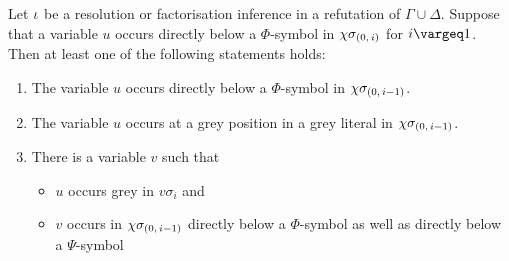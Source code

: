 \documentclass[,%
	draft=false,%
	numbers=noendperiod
	12pt,
	a4paper,
	oneside,%
	openany,
]{memoir}
\newcommand{\inv}{\ensuremath{\chi}}
\begin{document}
\begin{lemma}
	\label{lemma:var_below_phi_symbol}
	Let $\iota$ be a resolution or factorisation inference in a refutation of $\Gamma\cup\Delta$.
	Suppose that a variable $u$ occurs directly below a $\Phi$-symbol in $\inv\sigmazi$ for $i\vargeq 1$.
	Then at least one of the following statements holds:
	\begin{enumerate}
		\item
			\label{14_1}
			The variable $u$ occurs directly below a $\Phi$-symbol in $\inv\sigmazmi$.

		\item
			\label{14_4}
			The variable $u$ occurs at a grey position in a grey literal in $\inv\sigmazmi$.

		\item 
			\label{14_2}
			There is a variable $v$ such that 
			{
				\renewcommand{\labelitemi}{\textendash}
				\begin{itemize}
					\item $u$ occurs grey in $v\sigma_i$ and
					\item $v$ occurs in $\inv\sigmazmi$ directly below a $\Phi$-symbol as well as directly below a $\Psi$-symbol
				\end{itemize}
			}

	\end{enumerate}
\end{lemma}
\end{document}
